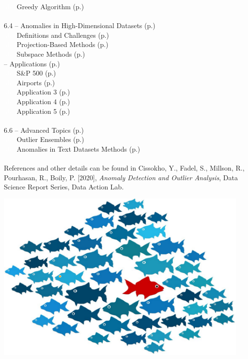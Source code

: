 \documentclass[20pt,landscape,footrule,headrule]{foils}
\newcommand{\localtextbulletone}{{\raisebox{.45ex}{\rule{.6ex}{.6ex}}}}
\begin{document}
\textcolor{white}{ab} \localtextbulletone\ Greedy Algorithm (p.\@\pageref{6.3.2}) 
\normalsize \ \\ \ \\ 
6.4 -- Anomalies in High-Dimensional Datasets (p.\pageref{6.4}) \\ 
\small
\textcolor{white}{ab} \localtextbulletone\ Definitions and Challenges (p.\@\pageref{6.4.1}) \\ 
\textcolor{white}{ab} \localtextbulletone\ Projection-Based Methods (p.\@\pageref{6.4.2}) \\ 
\textcolor{white}{ab} \localtextbulletone\ Subspace  Methods (p.\@\pageref{6.4.3}) 
\normalsize
\newpage\ \\  -- Applications  (p.\pageref{6.5}) \\ 
\small
\textcolor{white}{ab} \localtextbulletone\ S\&P 500 (p.\@\pageref{6.5.1}) \\ 
\textcolor{white}{ab} \localtextbulletone\ Airports (p.\@\pageref{6.5.2}) \\ 
\textcolor{white}{ab} \localtextbulletone\ Application 3 (p.\@\pageref{6.5.3}) \\ 
\textcolor{white}{ab} \localtextbulletone\ Application 4 (p.\@\pageref{6.5.4}) \\ 
\textcolor{white}{ab} \localtextbulletone\ Application 5 (p.\@\pageref{6.5.5}) 
\normalsize \ \\ \ \\ 
6.6 -- Advanced Topics (p.\pageref{6.6}) \\ 
\small
\textcolor{white}{ab} \localtextbulletone\ Outlier Ensembles (p.\@\pageref{6.6.1}) \\ 
\textcolor{white}{ab} \localtextbulletone\ Anomalies in Text Datasets Methods (p.\@\pageref{6.6.2})\normalsize 
 \ \\ \ \\ 
References and other details can be found in Cissokho, Y., Fadel, S., Millson, R., Pourhasan, R., Boily, P. [2020], \textit{Anomaly Detection and Outlier Analysis}, Data Science Report Series, Data Action Lab.


\newpage
\begin{center}
\includegraphics[width=0.95\textwidth]{Images/fish.png}
\end{center}
\end{document}
